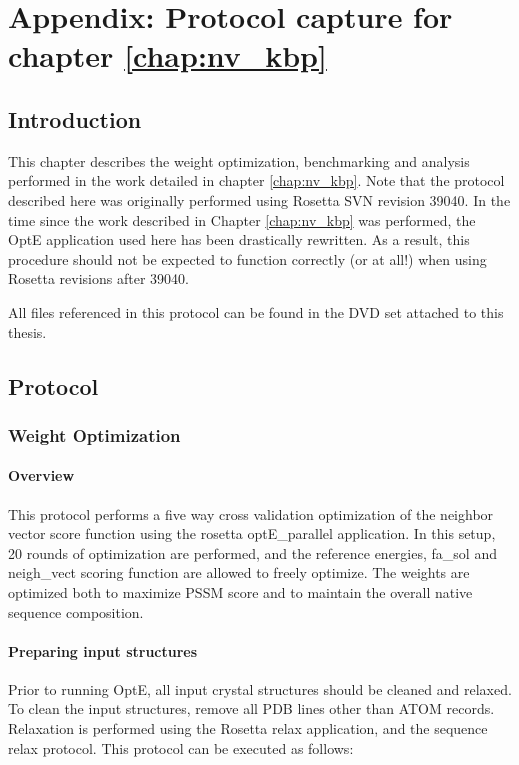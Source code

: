 \chapter{Appendix: Protocol capture for chapter \ref{chap:nv_kbp}}

\section{Introduction}

This chapter describes the weight optimization, benchmarking and analysis performed in the work detailed in chapter \ref{chap:nv_kbp}.
Note that the protocol described here was originally performed using Rosetta SVN revision 39040.
In the time since the work described in Chapter \ref{chap:nv_kbp} was performed, the OptE application used here has been drastically rewritten.
As a result, this procedure should not be expected to function correctly (or at all!) when using Rosetta revisions after 39040.

All files referenced in this protocol can be found in the DVD set attached to this thesis. 

\section{Protocol}

\subsection{Weight Optimization}
\label{subsec:nv_weight_opt}
\subsubsection{Overview}
This protocol performs a five way cross validation optimization of the neighbor vector score function using the rosetta optE\_parallel application.
In this setup, 20 rounds of optimization are performed, and the reference energies, fa\_sol and neigh\_vect scoring function are allowed to freely optimize.
The weights are optimized both to maximize \ac{PSSM} score and to maintain the overall native sequence composition.

\subsubsection{Preparing input structures}
\label{subsubsec:nv_input_prep}
Prior to running OptE, all input crystal structures should be cleaned and relaxed.
To clean the input structures, remove all \ac{PDB} lines other than ATOM records.
Relaxation is performed using the Rosetta relax application, and the sequence relax protocol.
This protocol can be executed as follows:

